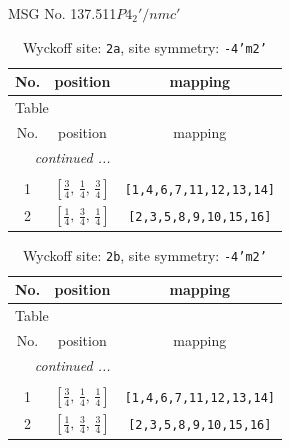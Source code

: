 \documentclass[fleqn,8pt]{jsarticle}
\begin{document}
\setcounter{MaxMatrixCols}{32}

\renewcommand{\tablename}{Table~}
\renewcommand{\figurename}{Figure~}
\begin{center}
\LARGE
MSG No. 137.511\quad$P4_{2}'/nmc'$
\end{center}
\renewcommand{\arraystretch}{1.2}
\begin{longtable}{ccc}
\caption{Wyckoff site: {\tt 2a}, site symmetry: {\tt -4'm2'}}
 \\
 \hline \hline
No. & position & mapping \\ \hline \endfirsthead

\multicolumn{2}{l}{\tablename\ \thetable{}} \\
 \hline \hline
No. & position & mapping \\ \hline \endhead

 \hline \hline
\multicolumn{2}{r}{\footnotesize\it continued ...} \\ \endfoot

 \hline \hline
\multicolumn{2}{r}{} \\ \endlastfoot

1 & $\left[ \frac{3}{4},\, \frac{1}{4},\, \frac{3}{4} \right]$ & {\tt [1,4,6,7,11,12,13,14]} \\ \hline
2 & $\left[ \frac{1}{4},\, \frac{3}{4},\, \frac{1}{4} \right]$ & {\tt [2,3,5,8,9,10,15,16]} \\
\end{longtable}
\renewcommand{\arraystretch}{1.2}
\begin{longtable}{ccc}
\caption{Wyckoff site: {\tt 2b}, site symmetry: {\tt -4'm2'}}
 \\
 \hline \hline
No. & position & mapping \\ \hline \endfirsthead

\multicolumn{2}{l}{\tablename\ \thetable{}} \\
 \hline \hline
No. & position & mapping \\ \hline \endhead

 \hline \hline
\multicolumn{2}{r}{\footnotesize\it continued ...} \\ \endfoot

 \hline \hline
\multicolumn{2}{r}{} \\ \endlastfoot

1 & $\left[ \frac{3}{4},\, \frac{1}{4},\, \frac{1}{4} \right]$ & {\tt [1,4,6,7,11,12,13,14]} \\ \hline
2 & $\left[ \frac{1}{4},\, \frac{3}{4},\, \frac{3}{4} \right]$ & {\tt [2,3,5,8,9,10,15,16]} \\
\end{longtable}
\end{document}
